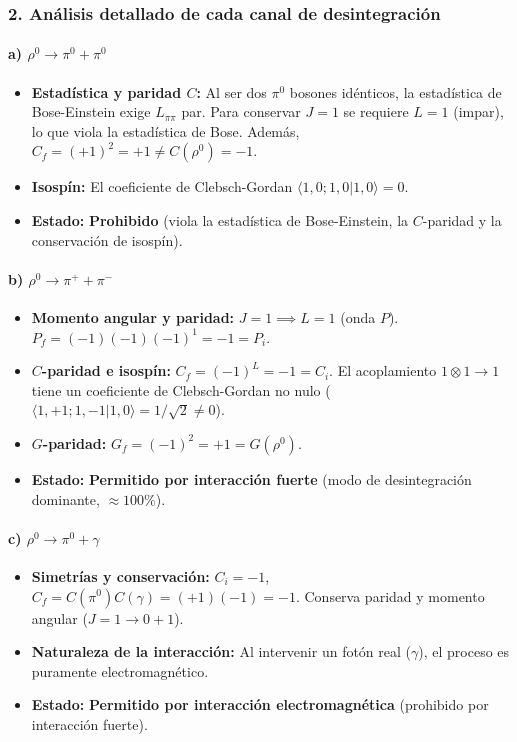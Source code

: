 \begin{problema}
\subsubsection*{2. Análisis detallado de cada canal de desintegración}

\paragraph{a) $\rho^0 \rightarrow \pi^0 + \pi^0$}
\begin{itemize}
    \item \textbf{Estadística y paridad $C$:} Al ser dos $\pi^0$ bosones idénticos, la estadística de Bose-Einstein exige $L_{\pi\pi}$ par. Para conservar $J=1$ se requiere $L=1$ (impar), lo que viola la estadística de Bose. Además, $C_f = (+1)^2 = +1 \neq C(\rho^0) = -1$.
    \item \textbf{Isospín:} El coeficiente de Clebsch-Gordan $\langle 1,0; 1,0 | 1,0 \rangle = 0$.
    \item \textbf{Estado:} \textbf{Prohibido} (viola la estadística de Bose-Einstein, la $C$-paridad y la conservación de isospín).
\end{itemize}

\paragraph{b) $\rho^0 \rightarrow \pi^+ + \pi^-$}
\begin{itemize}
    \item \textbf{Momento angular y paridad:} $J=1 \implies L=1$ (onda $P$). $P_f = (-1)(-1)(-1)^1 = -1 = P_i$.
    \item \textbf{$C$-paridad e isospín:} $C_f = (-1)^L = -1 = C_i$. El acoplamiento $1 \otimes 1 \to 1$ tiene un coeficiente de Clebsch-Gordan no nulo ($\langle 1,+1; 1,-1 | 1,0 \rangle = 1/\sqrt{2} \neq 0$).
    \item \textbf{$G$-paridad:} $G_f = (-1)^2 = +1 = G(\rho^0)$.
    \item \textbf{Estado:} \textbf{Permitido por interacción fuerte} (modo de desintegración dominante, $\approx 100\%$).
\end{itemize}

\paragraph{c) $\rho^0 \rightarrow \pi^0 + \gamma$}
\begin{itemize}
    \item \textbf{Simetrías y conservación:} $C_i = -1$, $C_f = C(\pi^0) C(\gamma) = (+1)(-1) = -1$. Conserva paridad y momento angular ($J=1 \to 0 + 1$).
    \item \textbf{Naturaleza de la interacción:} Al intervenir un fotón real ($\gamma$), el proceso es puramente electromagnético.
    \item \textbf{Estado:} \textbf{Permitido por interacción electromagnética} (prohibido por interacción fuerte).
\end{itemize}


\end{problema}
